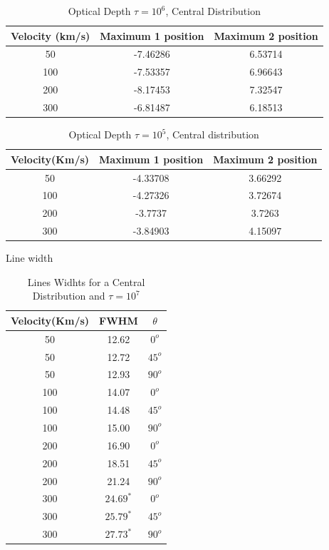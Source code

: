 \documentclass[usenatbib]{mn2e}
\begin{document}
\begin{table}
\begin{center}
\begin{tabular}{ccc}\hline 
Velocity (km/s) & Maximum 1 position & Maximum 2 position\\ \hline
50 & -7.46286 & 6.53714 \\ 
100 & -7.53357 & 6.96643 \\ 
200 & -8.17453 & 7.32547 \\ 
300 & -6.81487 & 6.18513 \\ \hline 
\end{tabular} 
\end{center}
\caption{Optical Depth $\tau = 10^{6}$, Central Distribution}
\end{table}

\begin{table}
\begin{center}
\begin{tabular}{ccc}\hline 
Velocity(Km/s) & Maximum 1 position & Maximum 2 position\\ \hline
50 & -4.33708 & 3.66292 \\ 
100 & -4.27326 & 3.72674 \\ 
200 & -3.7737 & 3.7263   \\ 
300 & -3.84903 & 4.15097 \\ \hline 
\end{tabular}
\caption{Optical Depth $\tau=10^{5}$, Central distribution} 
\end{center}
\end{table}

Line width\\

\begin{table}
\begin{center}
\begin{tabular}{ccc}\hline 
Velocity(Km/s) & FWHM & $\theta$\\ \hline 
50 & 12.62 & $0^{o}$ \\ 
50 & 12.72 & $45^{o}$ \\ 
50 & 12.93 & $90^{o}$ \\ 
100 & 14.07 & $0^{o}$ \\ 
100 & 14.48 & $45^{o}$ \\ 
100 & 15.00 & $90^{o}$ \\ 
200 & 16.90 & $0^{o}$  \\ 
200 & 18.51 & $45^{o}$ \\ 
200 & 21.24 & $90^{o}$ \\ 
300 & $24.69^{*}$ & $0^{o}$ \\ 
300 & $25.79^{*}$ & $45^{o}$  \\ 
300 & $27.73^{*}$ & $90^{o}$ \\ \hline
\end{tabular}
\caption{Lines Widhts for a Central Distribution and $\tau=10^{7}$} 
\end{center}
\end{table}
\end{document}
